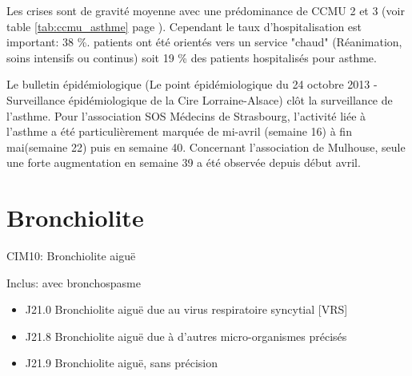 \documentclass[12pt,english,french,twoside]{book}\usepackage[]{graphicx}\usepackage[]{color}
\begin{document}
Les crises sont de gravité moyenne avec une prédominance de CCMU 2 et 3 (voir table \ref{tab:ccmu_asthme} page \pageref{tab:ccmu_asthme}).
Cependant le taux d'hospitalisation est important: 38 \%.
 patients ont été orientés vers un service "chaud" (Réanimation, soins intensifs ou continus) soit 19 \% des patients hospitalisés pour asthme.

Le bulletin épidémiologique (Le point épidémiologique du 24 octobre 2013 - Surveillance épidémiologique de la Cire Lorraine-Alsace) clôt la surveillance de l’asthme. Pour l’association SOS Médecins de Strasbourg, l’activité liée à l’asthme a été particulièrement marquée de mi-avril (semaine 16) à fin mai(semaine 22) puis en semaine 40. Concernant l’association de Mulhouse, seule une forte augmentation en semaine 39 a été observée depuis début avril.

\section{Bronchiolite}

CIM10: Bronchiolite aiguë

Inclus:
    avec bronchospasme
\begin{itemize}
  \item J21.0 Bronchiolite aiguë due au virus respiratoire syncytial [VRS]
  \item J21.8 Bronchiolite aiguë due à d'autres micro-organismes précisés
  \item J21.9 Bronchiolite aiguë, sans précision
\end{itemize}
\end{document}
